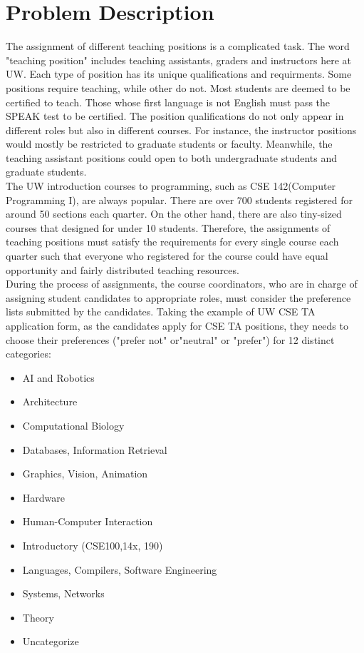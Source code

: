 \documentclass[twoside,twocolumn]{article}
\begin{document}
    \section{Problem Description}
    \indent The assignment of different teaching positions is a complicated task. The word "teaching position" 
    includes teaching assistants, graders and instructors here at UW. Each type of position has its 
    unique qualifications and requirments. Some positions require teaching, while other do not. 
    Most students are deemed to be certified to teach. Those whose first language is not English must 
    pass the SPEAK test to be certified. The position qualifications do not only appear in different roles 
    but also in different courses. For instance, the instructor positions would mostly be restricted to 
    graduate students or faculty. Meanwhile, the teaching assistant positions could open to both undergraduate students and 
    graduate students.
    \\ \indent The UW introduction courses to programming, such as CSE 142(Computer Programming I), are always popular. 
    There are over 700 students registered for around 50 sections each quarter. On the other hand, there are 
    also tiny-sized courses that designed for under 10 students. Therefore, the assignments of teaching positions 
    must satisfy the requirements for every single course each quarter such that everyone who registered for the course
    could have equal opportunity and fairly distributed teaching resources.   
    \\ \indent During the process of assignments, the course coordinators, who are in charge of assigning student candidates
    to appropriate roles, must consider the preference lists submitted by the candidates. Taking
    the example of UW CSE TA application form, as the candidates apply for CSE TA positions, they needs to choose their preferences 
    ("prefer not" or"neutral" or "prefer") for 12 distinct categories:
    \begin{itemize}
        \item AI and Robotics			
        \item Architecture			
        \item Computational Biology			
        \item Databases, Information Retrieval			
        \item Graphics, Vision, Animation			
        \item Hardware			
        \item Human-Computer Interaction			
        \item Introductory (CSE100,14x, 190)			
        \item Languages, Compilers, Software Engineering			
        \item Systems, Networks
        \item Theory			
        \item Uncategorize
    \end{itemize}
\end{document}
